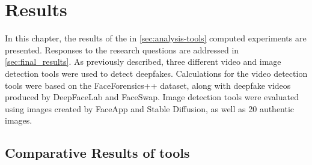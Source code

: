 
\chapter{Results}\label{chapter:results}
In this chapter, the results of the in \autoref{sec:analysis-tools} computed experiments are
presented. Responses to the research questions are addressed in \autoref{sec:final_results}.
As previously described, three different video and image detection tools were used
to detect deepfakes. Calculations for the video detection tools were based on the
FaceForensics++ dataset, along with deepfake videos produced by DeepFaceLab and FaceSwap.
Image detection tools were evaluated using images created by FaceApp and Stable Diffusion,
as well as 20 authentic images.

\section{Comparative Results of tools}

